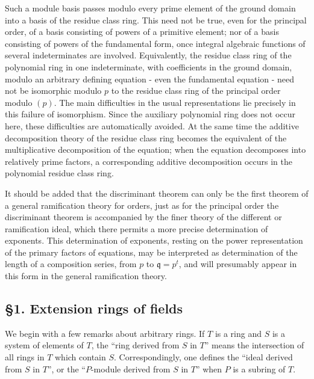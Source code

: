 \documentclass[11pt]{article}
\begin{document}
Such a module basis passes modulo every prime element of the ground
domain into a basis of the residue class ring. This need not be true,
even for the principal order, of a basis consisting of powers of a
primitive element; nor of a basis consisting of powers of the
fundamental form, once integral algebraic functions of several
indeterminates are involved. Equivalently, the residue class ring of the
polynomial ring in one indeterminate, with coefficients in the ground
domain, modulo an arbitrary defining equation - even the fundamental
equation - need not be isomorphic modulo \(p\) to the residue class ring
of the principal order modulo \((p)\). The main difficulties in the
usual representations lie precisely in this failure of isomorphism.
Since the auxiliary polynomial ring does not occur here, these
difficulties are automatically avoided. At the same time the additive
decomposition theory of the residue class ring becomes the equivalent of
the multiplicative decomposition of the equation; when the equation
decomposes into relatively prime factors, a corresponding additive
decomposition occurs in the polynomial residue class ring.

It should be added that the discriminant theorem can only be the first
theorem of a general ramification theory for orders, just as for the
principal order the discriminant theorem is accompanied by the finer
theory of the different or ramification ideal, which there permits a
more precise determination of exponents. This determination of
exponents, resting on the power representation of the primary factors of
equations, may be interpreted as determination of the length of a
composition series, from \(p\) to \(\mathfrak q=p^t\), and will
presumably appear in this form in the general ramification theory.

\subsection{§1. Extension rings of
fields}\label{extension-rings-of-fields}

We begin with a few remarks about arbitrary rings. If \(T\) is a ring
and \(S\) is a system of elements of \(T\), the ``ring derived from
\(S\) in \(T\)'' means the intersection of all rings in \(T\) which
contain \(S\). Correspondingly, one defines the ``ideal derived from
\(S\) in \(T\)'', or the ``\(P\)-module derived from \(S\) in \(T\)''
when \(P\) is a subring of \(T\).
\end{document}
